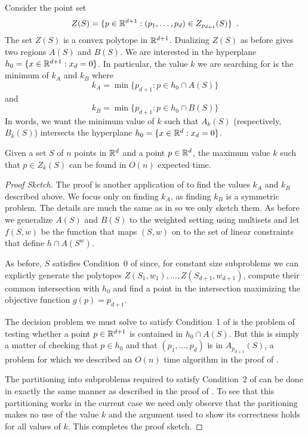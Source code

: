 \documentclass[lotsofwhite]{patmorin}
\begin{document}
Consider the point set
\[
    Z(S)=\{p\in\mathbb{R}^{d+1} : (p_1,\ldots,p_d)\in Z_{p_{d+1}}(S)  \} \enspace .
\]
The set $Z(S)$ is a convex polytope in $\mathbb{R}^{d+1}$.
Dualizing $Z(S)$ as before gives two regions
$A(S)$ and $B(S)$.
We are interested in the hyperplane $h_0=\{x\in\mathbb{R}^{d+1}:x_d=0\}$.
In particular, the value $k$ we are searching for is the minimum of
$k_A$ and $k_B$ where
\[
   k_A = \min\{p_{d+1}: p\in h_0\cap A(S)\}
\]
and
\[
   k_B = \min\{p_{d+1}: p\in h_0\cap B(S)\}
\]
In words, we want the minimum value of $k$ such that $A_k(S)$
(respectively, $B_k(S)$)
intersects the hyperplane $h_0=\{x\in\mathbb{R}^d: x_d=0\}$.

\begin{thm}
Given a set $S$ of $n$ points in $\mathbb{R}^d$ and a point $p\in\mathbb{R}^d$, the
maximum value $k$ such that $p\in Z_k(S)$ can be found in $O(n)$
expected time.
\end{thm}

\begin{proof}[Proof Sketch]
The proof is another application of  to find the values
$k_A$ and $k_B$ described above.  We focus only on finding $k_A$, as
finding $k_B$ is a symmetric problem.  The details are much the same
as in  so we only sketch them.  As before we
generalize $A(S)$ and $B(S)$ to the weighted setting using multisets
and let $f(S,w)$ be the function that maps $(S,w)$ on to the set of
linear constraints that define $h\cap A(S^w)$.

As before, $S$ satisfies Condition~0 of  since, for
constant size subproblems we can explictly generate the polytopes
$Z(S_1,w_1),\ldots,Z(S_{d+1},w_{d+1})$, compute their common
intersection with $h_0$ and find a point in the intersection
maximizing the objective function $g(p)=p_{d+1}$. 

The decision problem we must solve to satisfy Condition~1 of
 is the problem of testing whether a point $p\in
\mathbb{R}^{d+1}$ is contained in $h_0\cap A(S)$.  But this is simply a matter
of checking that $p\in h_0$ and that $(p_1,\ldots,p_d)$ is in
$A_{p_{d+1}}(S)$, a problem for which we described an $O(n)$ time
algorithm in the proof of .

The partitioning into subproblems required to satisfy Condition~2 of
 can be done in exactly the same manner as described in
the proof of .  To see that this partitioning works
in the current case we need only observe that the paritioning makes no
use of the value $k$ and the argument used to show its correctness
holds for all values of $k$.  This completes the proof sketch.
\end{proof}



\end{document}
